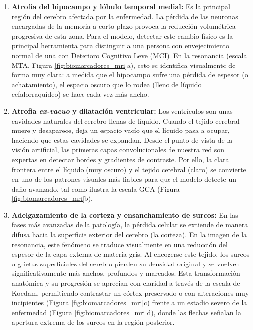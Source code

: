 \documentclass[12pt, oneside, english, spanish]{book}
\begin{document}
\begin{enumerate}
	\item \textbf{Atrofia del hipocampo y lóbulo temporal medial:} Es la principal región del cerebro afectada por la enfermedad. La pérdida de las neuronas encargadas de la memoria a corto plazo provoca la reducción volumétrica progresiva de esta zona. Para el modelo, detectar este cambio físico es la principal herramienta para distinguir a una persona con envejecimiento normal de una con Deterioro Cognitivo Leve (MCI). En la resonancia (escala MTA, Figura \ref{fig:biomarcadores_mri}a), esto se identifica visualmente de forma muy clara: a medida que el hipocampo sufre una pérdida de espesor (o achatamiento), el espacio oscuro que lo rodea (lleno de líquido cefalorraquídeo) se hace cada vez más ancho.	
	
	\item \textbf{Atrofia \textit{ex-vacuo} y dilatación ventricular:} Los ventrículos son unas cavidades naturales del cerebro llenas de líquido. Cuando el tejido cerebral muere y desaparece, deja un espacio vacío que el líquido pasa a ocupar, haciendo que estas cavidades se expandan. Desde el punto de vista de la visión artificial, las primeras capas convolucionales de nuestra red son expertas en detectar bordes y gradientes de contraste. Por ello, la clara frontera entre el líquido (muy oscuro) y el tejido cerebral (claro) se convierte en uno de los patrones visuales más fiables para que el modelo detecte un daño avanzado, tal como ilustra la escala GCA (Figura \ref{fig:biomarcadores_mri}b).
	
	\item \textbf{Adelgazamiento de la corteza y ensanchamiento de surcos:} En las fases más avanzadas de la patología, la pérdida celular se extiende de manera difusa hacia la superficie exterior del cerebro (la corteza). En la imagen de la resonancia, este fenómeno se traduce visualmente en una reducción del espesor de la capa externa de materia gris. Al encogerse este tejido, los surcos o grietas superficiales del cerebro pierden su densidad original y se vuelven significativamente más anchos, profundos y marcados. Esta transformación anatómica y su progresión se aprecian con claridad a través de la escala de Koedam, permitiendo contrastar un córtex preservado o con alteraciones muy incipientes (Figura \ref{fig:biomarcadores_mri}c) frente a un estadio severo de la enfermedad (Figura \ref{fig:biomarcadores_mri}d), donde las flechas señalan la apertura extrema de los surcos en la región posterior.
\end{enumerate}
\end{document}
